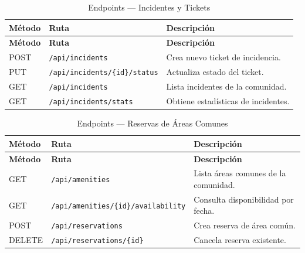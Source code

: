 \begin{longtable}{|p{}|p{}|p{}|}
\caption{Endpoints --- Incidentes y Tickets}\label{tab:ep-incidents}\\
\hline
\textbf{Método} & \textbf{Ruta} & \textbf{Descripción} \\
\hline
\endfirsthead
\hline \textbf{Método} & \textbf{Ruta} & \textbf{Descripción} \\ \hline
\endhead
\hline \endfoot

POST & \texttt{/api/incidents} & Crea nuevo ticket de incidencia. \\
\hline
PUT & \texttt{/api/incidents/\{id\}/status} & Actualiza estado del ticket. \\
\hline
GET & \texttt{/api/incidents} & Lista incidentes de la comunidad. \\
\hline
GET & \texttt{/api/incidents/stats} & Obtiene estadísticas de incidentes. \\

\end{longtable}

\begin{longtable}{|p{}|p{}|p{}|}
\caption{Endpoints --- Reservas de Áreas Comunes}\label{tab:ep-reservations}\\
\hline
\textbf{Método} & \textbf{Ruta} & \textbf{Descripción} \\
\hline
\endfirsthead
\hline \textbf{Método} & \textbf{Ruta} & \textbf{Descripción} \\ \hline
\endhead
\hline \endfoot

GET & \texttt{/api/amenities} & Lista áreas comunes de la comunidad. \\
\hline
GET & \texttt{/api/amenities/\{id\}/availability} & Consulta disponibilidad por fecha. \\
\hline
POST & \texttt{/api/reservations} & Crea reserva de área común. \\
\hline
DELETE & \texttt{/api/reservations/\{id\}} & Cancela reserva existente. \\

\end{longtable}

